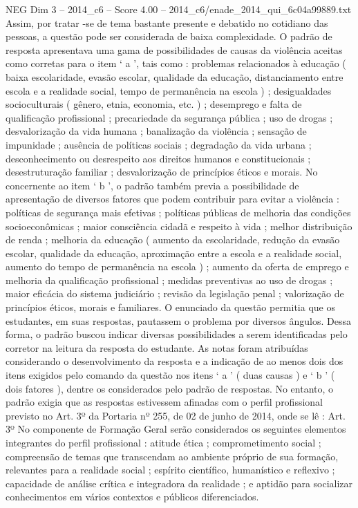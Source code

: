 \begin{textsample}{NEG Dim 3 – 2014\_c6 – Score 4.00 – 2014\_c6/enade\_2014\_qui\_6c04a99889.txt}
Assim, por tratar -se de tema bastante presente e debatido no cotidiano das pessoas, a questão pode ser considerada de baixa complexidade.
O padrão de resposta apresentava uma gama de possibilidades de causas da violência aceitas como corretas para o item ‘ a ’, tais como : problemas relacionados à educação ( baixa escolaridade, evasão escolar, qualidade da educação, distanciamento entre escola e a realidade social, tempo de permanência na escola ) ; desigualdades socioculturais ( gênero, etnia, economia, etc. ) ; desemprego e falta de qualificação profissional ; precariedade da segurança pública ; uso de drogas ; desvalorização da vida humana ; banalização da violência ; sensação de impunidade ; ausência de políticas sociais ; degradação da vida urbana ; desconhecimento ou desrespeito aos direitos humanos e constitucionais ; desestruturação familiar ; desvalorização de princípios éticos e morais.
No concernente ao item ‘ b ’, o padrão também previa a possibilidade de apresentação de diversos fatores que podem contribuir para evitar a violência : políticas de segurança mais efetivas ; políticas públicas de melhoria das condições socioeconômicas ; maior consciência cidadã e respeito à vida ; melhor distribuição de renda ; melhoria da educação ( aumento da escolaridade, redução da evasão escolar, qualidade da educação, aproximação entre a escola e a realidade social, aumento do tempo de permanência na escola ) ; aumento da oferta de emprego e melhoria da qualificação profissional ; medidas preventivas ao uso de drogas ; maior eficácia do sistema judiciário ; revisão da legislação penal ; valorização de princípios éticos, morais e familiares.
O enunciado da questão permitia que os estudantes, em suas respostas, pautassem o problema por diversos ângulos.
Dessa forma, o padrão buscou indicar diversas possibilidades a serem identificadas pelo corretor na leitura da resposta do estudante.
As notas foram atribuídas considerando o desenvolvimento da resposta e a indicação de ao menos dois dos itens exigidos pelo comando da questão nos itens ‘ a ’ ( duas causas ) e ‘ b ’ ( dois fatores ), dentre os considerados pelo padrão de respostas.
No entanto, o padrão exigia que as respostas estivessem afinadas com o perfil profissional previsto no Art. 3º da Portaria nº 255, de 02 de junho de 2014, onde se lê : Art. 3º No componente de Formação Geral serão considerados os seguintes elementos integrantes do perfil profissional : atitude ética ; comprometimento social ; compreensão de temas que transcendam ao ambiente próprio de sua formação, relevantes para a realidade social ; espírito científico, humanístico e reflexivo ; capacidade de análise crítica e integradora da realidade ; e aptidão para socializar conhecimentos em vários contextos e públicos diferenciados.

\end{textsample}
